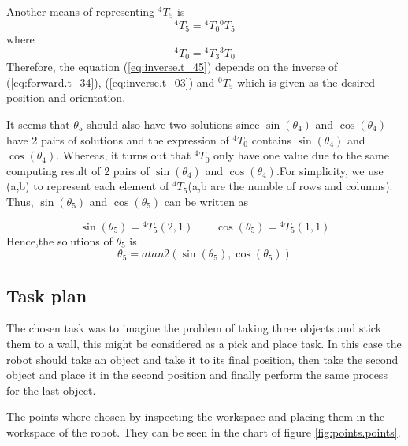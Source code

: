 \documentclass{article}
\renewcommand{\c}[1]{\cos(\theta_{#1})}
\newcommand{\s}[1]{\sin(\theta_{#1})}
\newcommand{\T}[2]{{}^{#1}T_{#2}}
\begin{document}
Another means of representing $\T{4}{5}$ is 
\begin{equation}
\label{eq:inverse.t_45}
\T{4}{5} = \T{4}{0} \T{0}{5}
\end{equation}
where
\begin{equation*}
\T{4}{0} = \T{4}{3}\T{3}{0}
\end{equation*}
Therefore, the equation (\ref{eq:inverse.t_45}) depends on the inverse of (\ref{eq:forward.t_34}), (\ref{eq:inverse.t_03}) and $\T{0}{5}$ which is given as the desired position and orientation. 

It seems that $\theta_5$ should also have two solutions since $\s{4}$ and $\c{4}$ have 2 pairs of solutions and the expression of $\T{4}{0}$ contains $\s{4}$ and $\c{4}$. Whereas, it turns out that $\T{4}{0}$ only have one value due to the same computing result of 2 pairs of $\s{4}$ and $\c{4}$.For simplicity, we use (a,b) to represent each element of $\T{4}{5}$(a,b are the numble of rows and columns). Thus, $\s{5}$ and $\c{5}$ can be written as

\begin{equation}
\s{5} = \T{4}{5}(2,1)
\qquad
\c{5} = \T{4}{5}(1,1)
\end{equation}
Hence,the solutions of $\theta_5$ is
\begin{equation}
\theta_{5} = atan2(\s{5},\c{5})
\end{equation}

\subsection{Task plan}
The chosen task was to imagine the problem of taking three objects and stick them to a wall, this might be considered as a pick and place task. In this case the robot should take an object and take it to its final position, then take the second object and place it in the second position and finally perform the same process for the last object.

The points where chosen by inspecting the workspace and placing them in the workspace of the robot. They can be seen in the chart of figure \ref{fig:points.points}.
\end{document}
